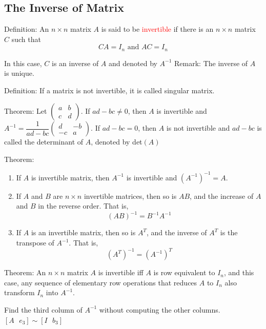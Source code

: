 \documentclass[12pt]{article}
\begin{document}
\subsection{The Inverse of Matrix}
Definition: An $n\times n$ matrix $A$ is said to be \textcolor{red}{invertible} if there is an $n\times n$ matrix $C$ such that $$CA = I_n \text{ and }AC = I_n$$

In this case, $C$ is an inverse of $A$ and denoted by $A^{-1}$
Remark: The inverse of $A$ is unique.

Definition: If a matrix is not invertible, it is called singular matrix.

Theorem: Let $\begin{pmatrix}
a & b \\
c & d 
\end{pmatrix}$. If $ad-bc\neq 0$, then $A$ is invertible and $A^{-1} = \dfrac{1}{ad-bc}\begin{pmatrix}
    d&-b\\
    -c&a
\end{pmatrix}$. If $ad-bc = 0$, then $A$ is not invertible and $ad-bc $ is called the determinant of $A$, denoted by det$(A)$

Theorem:
\begin{enumerate}
    \item If $A$ is invertible matrix, then $A^{-1}$ is invertible and $(A^{-1})^{-1} = A$.
    \item If $A$ and $B$ are $n\times n$ invertible matrices, then so is $AB$, and the increase of $A$ and $B$ in the reverse order. That is, $$(AB)^{-1} = B^{-1}A^{-1}$$
    \item If $A$ is an invertible matrix, then so is $A^T$, and the inverse of $A^T$ is the transpose of $A^{-1}$. That is, $$(A^T)^{-1} = (A^{-1})^T$$
\end{enumerate}

Theorem: An $n \times n$ matrix $A$ is invertible iff $A$ is row equivalent to $I_n$, and this case, any sequence of elementary row operations that reduces $A$ to $I_n$ also transform $I_n$ into $A^{-1}$.

Find the third column of $A^{-1}$ without computing the other columns.
$[A\text{    } e_3 ]\sim [I \text{    }b_3]$
\end{document}
